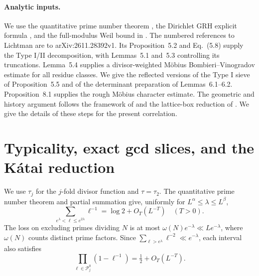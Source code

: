\documentclass[11pt]{amsart}
\numberwithin{equation}{section}
\theoremstyle{remark}
\begin{document}
\paragraph{Analytic inputs.}
We use the quantitative prime number theorem \cite[Theorem~1.1 and Corollary~1.2]{JohnstonYang}, the Dirichlet GRH explicit formula \cite[Lemma~2]{KandhilLanguascoMoree}, and the full-modulus Weil bound in \cite[Eq.~(1.2)]{BlomerMan}. The numbered references to Lichtman are to arXiv:2611.28392v1. Its Proposition~5.2 and Eq.~(5.8) supply the Type I/II decomposition, with Lemmas~5.1 and~5.3 controlling its truncations. Lemma~5.4 supplies a divisor-weighted M\"obius Bombieri--Vinogradov estimate for all residue classes. We give the reflected versions of the Type I sieve of Proposition~5.5 and of the determinant preparation of Lemmas~6.1--6.2. Proposition~8.1 supplies the rough M\"obius character estimate. The geometric and history argument follows the framework of \cite[Sections~9--11]{Lichtman} and the lattice-box reduction of \cite[Section~4.4]{LuWangWu}. We give the details of these steps for the present correlation.

\section{Typicality, exact gcd slices, and the K\'atai reduction}\label{sec:katai}

We use $\tau_j$ for the $j$-fold divisor function and $\tau=\tau_2$. The quantitative prime number theorem and partial summation give, uniformly for $L^\alpha\le\lambda\le L^\beta$,
\[
 \sum_{e^\lambda<\ell\le e^{2\lambda}}\ell^{-1}=\log 2+O_T(L^{-T})
 \quad (T>0).
\]
The loss on excluding primes dividing $N$ is at most $\omega(N)e^{-\lambda}\ll Le^{-\lambda}$, where $\omega(N)$ counts distinct prime factors. Since $\sum_{\ell>e^\lambda}\ell^{-2}\ll e^{-\lambda}$, each interval also satisfies
\begin{equation}\label{eq:prime-density}
 \prod_{\ell\in\mathcal P_j^0}(1-\ell^{-1})=\tfrac12+O_T(L^{-T}).
\end{equation}
\end{document}
